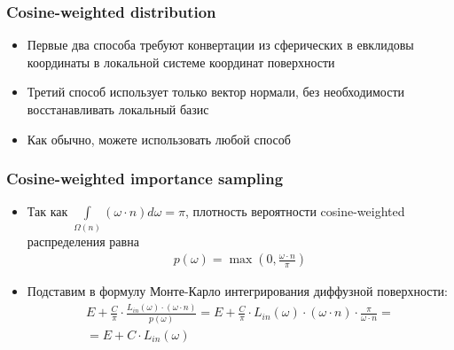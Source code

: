 \documentclass[handout,10pt]{beamer}
\begin{document}
\begin{frame}
\frametitle{Cosine-weighted distribution}
\begin{itemize}
\item Первые два способа требуют конвертации из сферических в евклидовы координаты в локальной системе координат поверхности
\pause
\item Третий способ использует только вектор нормали, без необходимости восстанавливать локальный базис
\pause
\item Как обычно, можете использовать любой способ
\end{itemize}
\end{frame}

\begin{frame}
\frametitle{Cosine-weighted importance sampling}
\begin{itemize}
\item Так как \begin{math}\int\limits_{\Omega(n)} (\omega \cdot n) d\omega = \pi\end{math}, плотность вероятности cosine-weighted распределения равна
\begin{gather*}
p(\omega) = \max\left(0, \frac{\omega\cdot n}{\pi}\right)
\end{gather*}
\pause
\item Подставим в формулу Монте-Карло интегрирования диффузной поверхности:
\begin{gather*}
E + \frac{C}{\pi} \cdot \frac{L_{in}(\omega) \cdot (\omega \cdot n)}{p(\omega)} = E + \frac{C}{\pi} \cdot L_{in}(\omega) \cdot (\omega \cdot n) \cdot \frac{\pi}{\omega \cdot n} = \\
= E + C \cdot L_{in}(\omega)
\end{gather*}
\end{itemize}
\end{frame}
\end{document}
